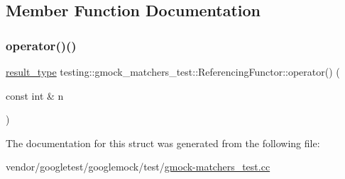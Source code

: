 \subsection{Member Function Documentation}
\mbox{\label{structtesting_1_1gmock__matchers__test_1_1_referencing_functor_a149f15ed9afbff28f5c3639c0f3eb255}} 
\subsubsection{\texorpdfstring{operator()()}{operator()()}}
{\footnotesize\ttfamily \hyperlink{structtesting_1_1gmock__matchers__test_1_1_referencing_functor_a5856a8175e2f797a6733a363b2834094}{result\+\_\+type} testing\+::gmock\+\_\+matchers\+\_\+test\+::\+Referencing\+Functor\+::operator() (\begin{DoxyParamCaption}\item[{const int \&}]{n }\end{DoxyParamCaption})\hspace{0.3cm}{\ttfamily [inline]}}



The documentation for this struct was generated from the following file\+:\begin{DoxyCompactItemize}
\item 
vendor/googletest/googlemock/test/\hyperlink{gmock-matchers__test_8cc}{gmock-\/matchers\+\_\+test.\+cc}\end{DoxyCompactItemize}
